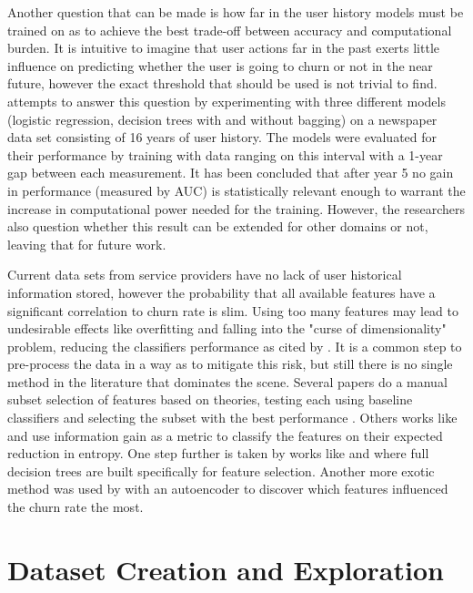 \documentclass{kththesis}
\begin{document}
Another question that can be made is how far in the user history models must be trained on as to achieve the best trade-off between accuracy and computational burden. It is intuitive to imagine that user actions far in the past exerts little influence on predicting whether the user is going to churn or not in the near future, however the exact threshold that should be used is not trivial to find. \citep{Ballings2012} attempts  to answer this question by experimenting with three different models (logistic regression, decision trees with and without bagging) on a newspaper data set consisting of 16 years of user history. The models were evaluated for their performance by training with data ranging on this interval with a 1-year gap between each measurement. It has been concluded that  after year 5 no gain in performance (measured by AUC) is statistically relevant enough to warrant the increase in computational power needed for the training. However, the researchers also question whether this result can be extended for other domains or not, leaving that for future work.

Current data sets from service providers have no lack of user historical information stored, however the probability that all available features have a significant correlation to churn rate is slim. Using too many features may lead to undesirable effects like overfitting and falling into the "curse of dimensionality" problem, reducing the classifiers performance as cited by \citep{guyon2003introduction}. It is a common step to pre-process the data in a way as to mitigate this risk, but still there is no single method in the literature that dominates the scene. Several papers do a manual subset selection of features based on theories, testing each using baseline classifiers and selecting the subset with the best performance \citep{Pudipeddi2014}\citep{Runge2014}. Others works like \citep{Borbora2011} and \citep{Dror2012} use information gain as a metric to classify the features on their expected reduction in entropy. One step further is taken by works like \citep{Lu2014} and \citep{Khan2015} where full decision trees are built specifically for feature selection. Another more exotic method was used by \citep{Wangperawong2016} with an autoencoder to discover which features influenced the churn rate the most. 

\chapter{Dataset Creation and Exploration}
\label{cha:data}
\end{document}
